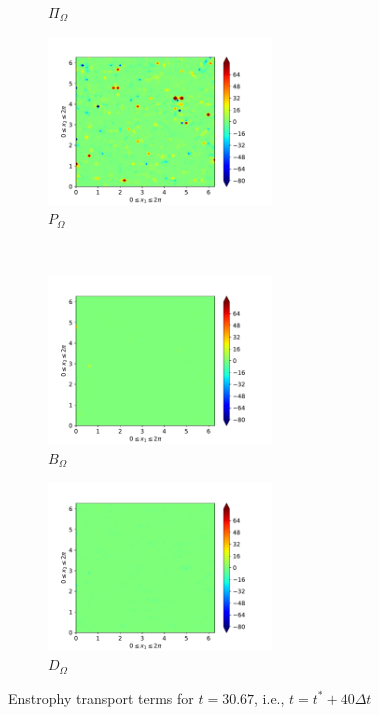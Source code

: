 \begin{figure}[H]
\begin{subfigure}{0.45\textwidth}
        \caption{$\Pi_{\Omega}$}
    \end{subfigure}
    \newline
    \begin{subfigure}{0.45\textwidth}
        \includegraphics[height=1.75in]{media/run-cds-65/P-enst-1380}
        \caption{$P_{\Omega}$}
    \end{subfigure}
    ~
    \begin{subfigure}{0.45\textwidth}
        \includegraphics[height=1.75in]{media/run-cds-65/B-enst-1380}
        \caption{$B_{\Omega}$}
    \end{subfigure}
    \newline
    \begin{subfigure}{0.45\textwidth}
        \includegraphics[height=1.75in]{media/run-cds-65/D-enst-1380}
        \caption{$D_{\Omega}$}
    \end{subfigure}
    \caption{Enstrophy transport terms for $t=30.67$, i.e., $t=t^{\ast} + 40 \Delta t$}
\end{figure}

\newpage

